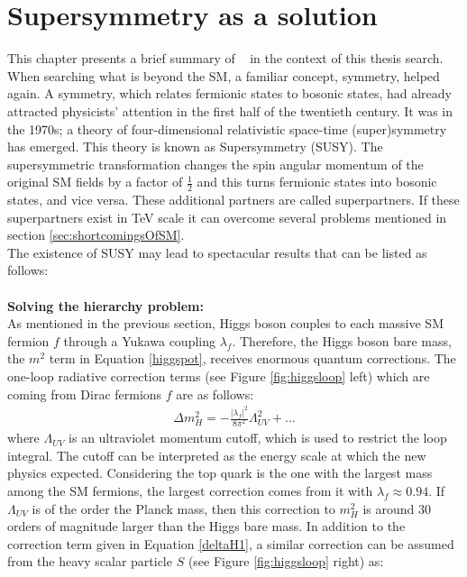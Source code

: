 \section{Supersymmetry as a solution}
\label{sec:susySol}
This chapter presents a brief summary of ~\cite{SUSY1} in the context of this thesis search.
When searching what is beyond the SM, a familiar concept, symmetry, helped again.  A symmetry, which relates fermionic states to bosonic states, had already attracted physicists' attention in the first half of the twentieth century. It was in the 1970s; a theory of four-dimensional relativistic space-time (super)symmetry has emerged. This theory is known as Supersymmetry (SUSY).  The supersymmetric transformation changes the spin angular momentum of the original SM fields by a factor of $\frac{1}{2}$ and this turns fermionic states into bosonic states, and vice versa.  These additional partners are called superpartners.  If these superpartners exist in TeV scale it can overcome several problems mentioned in section \ref{sec:shortcomingsOfSM}. \\
The existence of SUSY may lead to spectacular results that can be listed as follows:\\
\\
\textbf{Solving the hierarchy problem:}
\\
As mentioned in the previous section, Higgs boson couples to each massive SM fermion $f$ through a Yukawa coupling  $\lambda_f$. Therefore, the Higgs boson bare mass, the $m^2$ term in Equation \ref{higgspot}, receives enormous quantum corrections. The one-loop radiative correction terms (see Figure \ref{fig:higgsloop} left) which are coming from Dirac fermions $f$ are as follows:
\begin{eqnarray}
\label{deltaH1}
{\Delta m_H^2 = - \frac{|\lambda_f|^2}{8\pi^2}\Lambda_{UV}^2+...}
\end{eqnarray}
where $\Lambda_{UV}$ is an ultraviolet momentum cutoff, which is used to restrict the loop integral. The cutoff can be interpreted as the energy scale at which the new physics expected. 
Considering the top quark is the one with the largest mass among the SM fermions, the largest correction comes from it with $\lambda_f \approx 0.94$. If $\Lambda_{UV}$ is of the order the Planck mass, then this correction to $m_H^2$ is around 30 orders of magnitude larger than the Higgs bare mass.
In addition to the correction term given in Equation \ref{deltaH1}, a similar correction can be assumed from the heavy scalar particle $S$ (see Figure \ref{fig:higgsloop} right) as:
